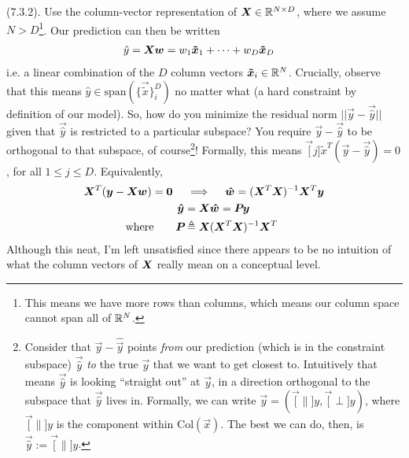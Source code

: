 \documentclass[11pt]{article}
\begin{document}
\myspace
\p {} (7.3.2). Use the column-vector representation of $\matr X \in \R^{N \times D}$, where we assume $N > D$\footnote{This means we have more rows than columns, which means our column space cannot span all of $\R^N$.}. Our prediction can then be written
\begin{align}
	\hat{y} &= \matr{X} \vec w = w_1 \vec[1]{\tilde x} + \cdots + w_D \vec[D]{\tilde x}
\end{align}
i.e. a linear combination of the $D$ column vectors $\vec[i]{\tilde x} \in \R^{N}$. Crucially, observe that this means $\hat y \in \text{span}(\{ \vec{\tilde x} \}_i^D)$ no matter what (a hard constraint by definition of our model). So, how do you minimize the residual norm $||\vec y - \vec{\hat y}||$ given that $\vec{\hat y}$ is restricted to a particular subspace? You require $\vec y - \vec{\hat y}$ to be orthogonal to that subspace, of course\footnote{Consider that $\vec y - \hat{\vec y}$ points \textit{from} our prediction (which is in the constraint subspace) $\vec{\hat y}$ \textit{to} the true $\vec y$ that we want to get closest to. Intuitively that means $\vec{\hat y}$ is looking ``straight out'' at $\vec y$, in a direction orthogonal to the subspace that $\vec{\hat y}$ lives in. Formally, we can write $\vec y = (\vec[\parallel]{y}, \vec[\perp]{y})$, where $\vec[\parallel]{y}$ is the component within $\text{Col}(\vec x)$. The best we can do, then, is $\vec{\hat y} := \vec[\parallel]{y} $.}! Formally, this means $\vec[j]{\tilde x}^T ( \vec y - \vec{\hat y}) = 0$, for all $1 \le j \le D$. Equivalently,
\begin{align}
	\matr{X}^T(\vec y - \matr X \vec w) = \vec 0 \quad &\implies \quad \vec{\hat w} = (\matr{X}^T \matr X)^{-1} \matr{X}^T \vec y \\
	\vec{\hat y}
		&= \matr X \vec{\hat w} = \matr{P} \vec{y} \\
	\text{where}\qquad
	\matr P &\triangleq \matr X (\matr{X}^T \matr X)^{-1} \matr{X}^T 
\end{align}
Although this neat, I'm left unsatisfied since there appears to be no intuition of what the column vectors of $\matr X$ really mean on a conceptual level. 
\end{document}
